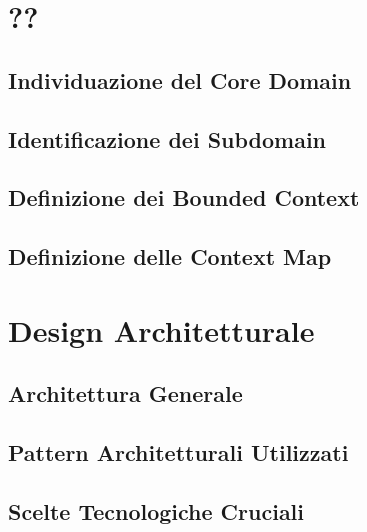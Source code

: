 \chapter{??}
    \section{Individuazione del Core Domain}
    \section{Identificazione dei Subdomain}
    \section{Definizione dei Bounded Context}
    \section{Definizione delle Context Map}
    
\chapter{Design Architetturale}
\section{Architettura Generale}
\section{Pattern Architetturali Utilizzati}
\section{Scelte Tecnologiche Cruciali}
